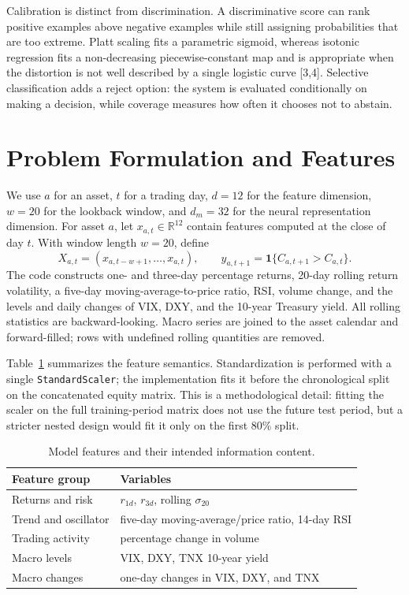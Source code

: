 \documentclass[11pt]{article}
\newcommand{\R}{\mathbb{R}}
\newcommand{\ind}{\mathbf{1}}
\begin{document}
Calibration is distinct from discrimination. A discriminative score can rank positive examples above negative examples while still assigning probabilities that are too extreme. Platt scaling fits a parametric sigmoid, whereas isotonic regression fits a non-decreasing piecewise-constant map and is appropriate when the distortion is not well described by a single logistic curve [3,4]. Selective classification adds a reject option: the system is evaluated conditionally on making a decision, while coverage measures how often it chooses not to abstain.

\section{Problem Formulation and Features}
We use $a$ for an asset, $t$ for a trading day, $d=12$ for the feature dimension, $w=20$ for the lookback window, and $d_m=32$ for the neural representation dimension. For asset $a$, let $x_{a,t}\in\R^{12}$ contain features computed at the close of day $t$. With window length $w=20$, define
\begin{equation}
 X_{a,t}=(x_{a,t-w+1},\ldots,x_{a,t}),\qquad y_{a,t+1}=\ind\{C_{a,t+1}>C_{a,t}\}.
\end{equation}
The code constructs one- and three-day percentage returns, 20-day rolling return volatility, a five-day moving-average-to-price ratio, RSI, volume change, and the levels and daily changes of VIX, DXY, and the 10-year Treasury yield. All rolling statistics are backward-looking. Macro series are joined to the asset calendar and forward-filled; rows with undefined rolling quantities are removed.

Table~\ref{tab:features} summarizes the feature semantics. Standardization is performed with a single \texttt{StandardScaler}; the implementation fits it before the chronological split on the concatenated equity matrix. This is a methodological detail: fitting the scaler on the full training-period matrix does not use the future test period, but a stricter nested design would fit it only on the first 80\% split.

\begin{table}[t]
\centering\scriptsize
\caption{Model features and their intended information content.}
\label{tab:features}
\begin{tabular}{p{}p{}}
\toprule
Feature group & Variables \\
\midrule
Returns and risk & $r_{1d}$, $r_{3d}$, rolling $\sigma_{20}$ \\
Trend and oscillator & five-day moving-average/price ratio, 14-day RSI \\
Trading activity & percentage change in volume \\
Macro levels & VIX, DXY, TNX 10-year yield \\
Macro changes & one-day changes in VIX, DXY, and TNX \\
\bottomrule
\end{tabular}
\end{table}
\end{document}
